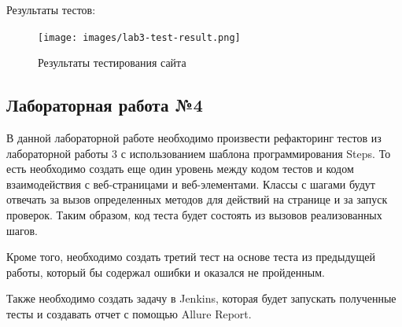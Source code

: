 \documentclass[a4paper]{article}
\begin{document}
    Результаты тестов:
    \begin{figure}[H]
        \centering
        \begin{minipage}[t]{0.6\textwidth}
            \texttt{[image: images/lab3-test-result.png]}
        \end{minipage}
        \caption{Результаты тестирования сайта}
    \end{figure}
    \subsection{Лабораторная работа №4}
    В данной лабораторной работе необходимо произвести рефакторинг тестов из лабораторной работы 3 с использованием шаблона программирования Steps. То есть необходимо создать еще один уровень между кодом тестов и кодом взаимодействия с веб-страницами и веб-элементами. Классы с шагами будут отвечать за вызов определенных методов для действий на странице и за запуск проверок. Таким образом, код теста будет состоять из вызовов реализованных шагов. \par
    Кроме того, необходимо создать третий тест на основе теста из предыдущей работы, который бы содержал ошибки и оказался не пройденным. \par
    Также необходимо создать задачу в Jenkins, которая будет запускать полученные тесты и создавать отчет с помощью Allure Report.
\end{document}
